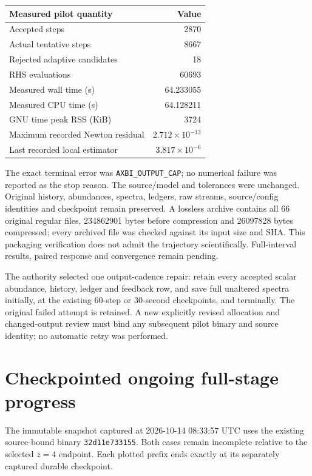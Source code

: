 \documentclass[11pt]{article}
\begin{document}
\begin{center}
\begin{tabular}{lr}\toprule
Measured pilot quantity & Value\\\midrule
Accepted steps & 2870\\
Actual tentative steps & 8667\\
Rejected adaptive candidates & 18\\
RHS evaluations & 60693\\
Measured wall time (s) & 64.233055\\
Measured CPU time (s) & 64.128211\\
GNU time peak RSS (KiB) & 3724\\
Maximum recorded Newton residual & $2.712\times10^{-13}$\\
Last recorded local estimator & $3.817\times10^{-6}$\\\bottomrule
\end{tabular}
\end{center}

The exact terminal error was \texttt{AXBI\_OUTPUT\_CAP}; no numerical failure was reported as the stop reason. The source/model and tolerances were unchanged. Original history, abundances, spectra, ledgers, raw streams, source/config identities and checkpoint remain preserved. A lossless archive contains all 66 original regular files, 234862901 bytes before compression and 26097828 bytes compressed; every archived file was checked against its input size and SHA. This packaging verification does not admit the trajectory scientifically. Full-interval results, paired response and convergence remain pending.

The authority selected one output-cadence repair: retain every accepted scalar abundance, history, ledger and feedback row, and save full unaltered spectra initially, at the existing 60-step or 30-second checkpoints, and terminally. The original failed attempt is retained. A new explicitly revised allocation and changed-output review must bind any subsequent pilot binary and source identity; no automatic retry was performed.

\section{Checkpointed ongoing full-stage progress}
The immutable snapshot captured at 2026-10-14 08:33:57 UTC uses the existing source-bound binary \texttt{32d11e733155}. Both cases remain incomplete relative to the selected $\bar z=4$ endpoint. Each plotted prefix ends exactly at its separately captured durable checkpoint.
\end{document}
